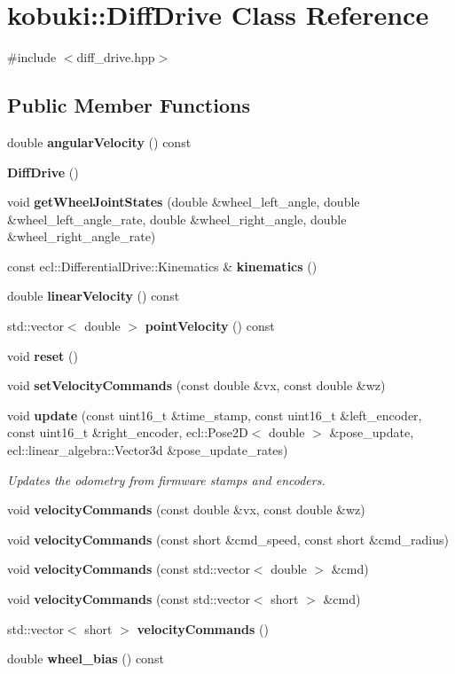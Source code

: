\section{kobuki\-:\-:\-Diff\-Drive \-Class \-Reference}
\label{classkobuki_1_1DiffDrive}


{\ttfamily \#include $<$diff\-\_\-drive.\-hpp$>$}

\subsection*{\-Public \-Member \-Functions}
\begin{DoxyCompactItemize}
\item 
double {\bf angular\-Velocity} () const 
\item 
{\bf \-Diff\-Drive} ()
\item 
void {\bf get\-Wheel\-Joint\-States} (double \&wheel\-\_\-left\-\_\-angle, double \&wheel\-\_\-left\-\_\-angle\-\_\-rate, double \&wheel\-\_\-right\-\_\-angle, double \&wheel\-\_\-right\-\_\-angle\-\_\-rate)
\item 
const \*
ecl\-::\-Differential\-Drive\-::\-Kinematics \& {\bf kinematics} ()
\item 
double {\bf linear\-Velocity} () const 
\item 
std\-::vector$<$ double $>$ {\bf point\-Velocity} () const 
\item 
void {\bf reset} ()
\item 
void {\bf set\-Velocity\-Commands} (const double \&vx, const double \&wz)
\item 
void {\bf update} (const uint16\-\_\-t \&time\-\_\-stamp, const uint16\-\_\-t \&left\-\_\-encoder, const uint16\-\_\-t \&right\-\_\-encoder, ecl\-::\-Pose2\-D$<$ double $>$ \&pose\-\_\-update, ecl\-::linear\-\_\-algebra\-::\-Vector3d \&pose\-\_\-update\-\_\-rates)
\begin{DoxyCompactList}\small\item\em \-Updates the odometry from firmware stamps and encoders. \end{DoxyCompactList}\item 
void {\bf velocity\-Commands} (const double \&vx, const double \&wz)
\item 
void {\bf velocity\-Commands} (const short \&cmd\-\_\-speed, const short \&cmd\-\_\-radius)
\item 
void {\bf velocity\-Commands} (const std\-::vector$<$ double $>$ \&cmd)
\item 
void {\bf velocity\-Commands} (const std\-::vector$<$ short $>$ \&cmd)
\item 
std\-::vector$<$ short $>$ {\bf velocity\-Commands} ()
\item 
double {\bf wheel\-\_\-bias} () const 
\end{DoxyCompactItemize}
